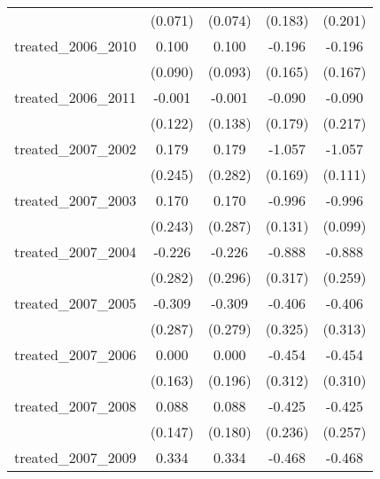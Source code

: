 {\begin{tabular}{l*{4}{c}}
            &     (0.071)         &     (0.074)         &     (0.183)         &     (0.201)         \\
[1em]
treated\_2006\_2010&       0.100         &       0.100         &      -0.196         &      -0.196         \\
            &     (0.090)         &     (0.093)         &     (0.165)         &     (0.167)         \\
[1em]
treated\_2006\_2011&      -0.001         &      -0.001         &      -0.090         &      -0.090         \\
            &     (0.122)         &     (0.138)         &     (0.179)         &     (0.217)         \\
[1em]
treated\_2007\_2002&       0.179         &       0.179         &      -1.057\sym{***}&      -1.057\sym{***}\\
            &     (0.245)         &     (0.282)         &     (0.169)         &     (0.111)         \\
[1em]
treated\_2007\_2003&       0.170         &       0.170         &      -0.996\sym{***}&      -0.996\sym{***}\\
            &     (0.243)         &     (0.287)         &     (0.131)         &     (0.099)         \\
[1em]
treated\_2007\_2004&      -0.226         &      -0.226         &      -0.888\sym{**} &      -0.888\sym{***}\\
            &     (0.282)         &     (0.296)         &     (0.317)         &     (0.259)         \\
[1em]
treated\_2007\_2005&      -0.309         &      -0.309         &      -0.406         &      -0.406         \\
            &     (0.287)         &     (0.279)         &     (0.325)         &     (0.313)         \\
[1em]
treated\_2007\_2006&       0.000         &       0.000         &      -0.454         &      -0.454         \\
            &     (0.163)         &     (0.196)         &     (0.312)         &     (0.310)         \\
[1em]
treated\_2007\_2008&       0.088         &       0.088         &      -0.425         &      -0.425         \\
            &     (0.147)         &     (0.180)         &     (0.236)         &     (0.257)         \\
[1em]
treated\_2007\_2009&       0.334\sym{*}  &       0.334         &      -0.468         &      -0.468         \\

\end{tabular}}
